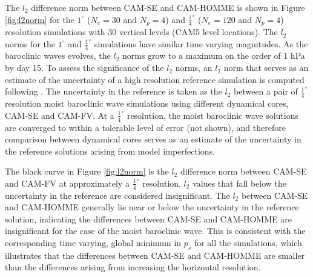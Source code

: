 \documentclass{agujournal}
\begin{document}
The $l_2$ difference norm between CAM-SE and CAM-HOMME is shown in Figure \ref{fig:l2norm} for the $1^{\circ}$ ($N_e=30$ and $N_p=4$) and $\frac{1}{4}^{\circ}$ ($N_e=120$ and $N_p=4$) resolution simulations with 30 vertical levels (CAM5 level locations). The $l_2$ norms for the $1^{\circ}$ and $\frac{1}{4}^{\circ}$ simulations have similar time varying magnitudes. As the baroclinic waves evolves, the $l_2$ norms grow to a maximum on the order of 1 hPa by day 15. To assess the significance of the $l_2$ norms, an $l_2$ norm that serves as an estimate of the uncertainty of a high resolution reference simulation is computed following \cite{JW2006QJR}. The uncertainty in the reference is taken as the $l_2$ between a pair of $\frac{1}{4}^{\circ}$ resolution moist baroclinic wave simulations using different dynamical cores, CAM-SE and CAM-FV. At a $\frac{1}{4}^{\circ}$ resolution, the moist baroclinic wave solutions are converged to within a tolerable level of error (not shown), and therefore comparison between dynamical cores serves as an estimate of the uncertainty in the reference solutions arising from model imperfections. 

The black curve in Figure \ref{fig:l2norm} is the $l_2$ difference norm between CAM-SE and CAM-FV at approximately a $\frac{1}{4}^{\circ}$ resolution. $l_2$ values that fall below the uncertainty in the reference are considered insignificant. The $l_2$ between CAM-SE and CAM-HOMME generally lie near or below the uncertainty in the reference solution, indicating the differences between CAM-SE and CAM-HOMME are insignificant for the case of the moist baroclinic wave. This is consistent with the corresponding time varying, global minimum in $p_s$ for all the simulations, which illustrates that the differences between CAM-SE and CAM-HOMME are smaller than the differences arising from increasing the horizontal resolution.
\end{document}
